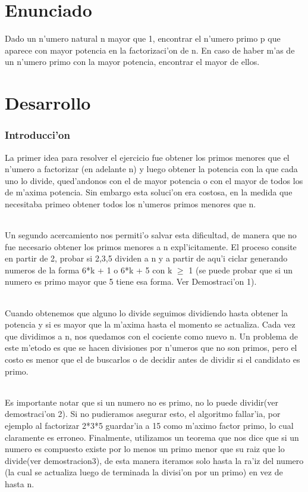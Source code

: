 \part{Enunciado}
Dado un n'umero natural n mayor que 1, encontrar el n'umero primo p que aparece con mayor potencia en la factorizaci'on de n. En caso de haber m'as de un n'umero primo con  la mayor potencia, encontrar el mayor de ellos.

\part{Desarrollo}
\section{Introducci'on}
La primer idea para resolver el ejercicio fue obtener los primos menores que el n'umero a factorizar
(en adelante n) y luego obtener la potencia con la que cada uno lo divide, qued'andonos con el de mayor
potencia o con el mayor de todos los de m'axima potencia. Sin embargo esta soluci'on era costosa, en la medida
que necesitaba primeo obtener todos los n'umeros primos menores que n.
\paragraph{}
Un segundo acercamiento nos permiti'o salvar esta dificultad, de manera que no fue necesario obtener los primos menores a n expl'icitamente. El proceso consite en partir de 2, probar si 2,3,5 dividen a n y a partir  de aqu'i ciclar generando numeros de la forma 6*k + 1 o 6*k + 5 con k $\geq$ 1 (se puede probar que si un numero es primo mayor que 5 tiene esa forma. Ver Demostraci'on 1).
\paragraph{}
Cuando obtenemos que alguno lo divide seguimos dividiendo hasta obtener la potencia y si es mayor que la m'axima hasta el momento se actualiza. Cada vez que dividimos a n, nos quedamos con el cociente como nuevo n. Un problema de este m'etodo es que se hacen  divisiones por n'umeros que no son primos, pero el costo es menor que el de buscarlos o de decidir antes de  dividir si el candidato es primo. 
\paragraph{}
Es importante notar que si un numero no es primo, no lo puede dividir(ver demostraci'on 2). Si no pudieramos asegurar esto, el algoritmo fallar'ia, por ejemplo al factorizar 2*3*5 guardar'ia a 15 como m'aximo factor primo, lo cual claramente es erroneo. Finalmente, utilizamos un teorema que nos dice que si un numero es compuesto existe por lo menos un primo menor que su raiz que lo divide(ver demostracion3), de esta manera iteramos solo hasta la ra'iz del numero (la cual se actualiza luego de terminada la divisi'on por un primo) en vez de hasta n.

